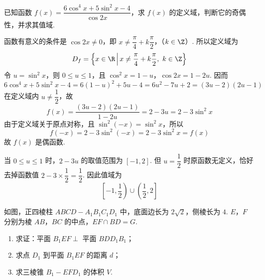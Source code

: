\begin{problem}
已知函数 \(f(x)=\dfrac{6\cos^{4}x+5\sin^{2}x-4}{\cos2x}\)，求 \(f(x)\) 的定义域，判断它的奇偶性，并求其值域.
\end{problem}

\begin{solution}
函数有意义的条件是 \(\cos2x\ne0\)，即
\(x\ne\dfrac\pi4+k\dfrac\pi2\)，（\(k\in\Z\)）.
所以定义域为
\[
D_f=\left\{x\in\R\,\middle|\,x\ne\dfrac\pi4+k\dfrac\pi2,\ k\in\Z\right\}
\]
令 \(u=\sin^2x\)，则 \(0\leqslant u\leqslant1\)，且 \(\cos^2x=1-u\)，\(\cos2x=1-2u\). 因而
\[
6\cos^4x+5\sin^2x-4
=6(1-u)^2+5u-4
=6u^2-7u+2
=(3u-2)(2u-1)
\]
在定义域内 \(u\ne\dfrac12\)，故
\[
f(x)=\dfrac{(3u-2)(2u-1)}{1-2u}=2-3u=2-3\sin^2x
\]
由于定义域关于原点对称，且 \(\sin^2(-x)=\sin^2x\)，所以
\[
f(-x)=2-3\sin^2(-x)=2-3\sin^2x=f(x)
\]
故 \(f(x)\) 是偶函数.

当 \(0\leqslant u\leqslant1\) 时，\(2-3u\) 的取值范围为 \([-1,2]\). 但 \(u=\dfrac12\) 时原函数无定义，恰好去掉函数值 \(2-3\times\dfrac12=\dfrac12\). 因此值域为
\[
\left[-1,\dfrac12\right)\cup\left(\dfrac12,2\right]
\]
\end{solution}

\begin{problem}
如图，正四棱柱 \(ABCD-A_{1}B_{1}C_{1}D_{1}\) 中，底面边长为 \(2\sqrt2\)，侧棱长为 \(4\). \(E\)，\(F\) 分别为棱 \(AB\)，\(BC\) 的中点，\(EF\cap BD=G\).

\begin{enumerate}
\item 求证：平面 \(B_{1}EF\perp\) 平面 \(BDD_{1}B_{1}\)；
\item 求点 \(D_{1}\) 到平面 \(B_{1}EF\) 的距离 \(d\)；
\item 求三棱锥 \(B_{1}-EFD_{1}\) 的体积 \(V\).
\end{enumerate}

\end{problem}

